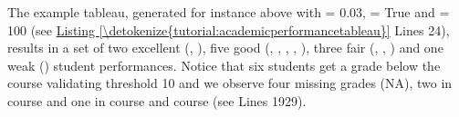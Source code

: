 \documentclass[a4paper,12pt,english]{sphinxhowto}
\begin{document}
\begin{sphinxVerbatim}[commandchars=\\\{\},numbers=left,firstnumber=1,stepnumber=1]
\end{sphinxVerbatim}

The example tableau, generated for instance above with  = 0.03,  = True and  = 100 (see \hyperref[\detokenize{tutorial:academicperformancetableau}]{Listing \ref{\detokenize{tutorial:academicperformancetableau}}} Lines 2\sphinxhyphen{}4), results in a set of two excellent (, ), five good (, , , , ), three fair (, , ) and one weak () student performances. Notice that six students get a grade below the course validating threshold 10 and we observe four missing grades (NA), two in course  and one in course  and course  (see Lines 19\sphinxhyphen{}29).
\end{document}
